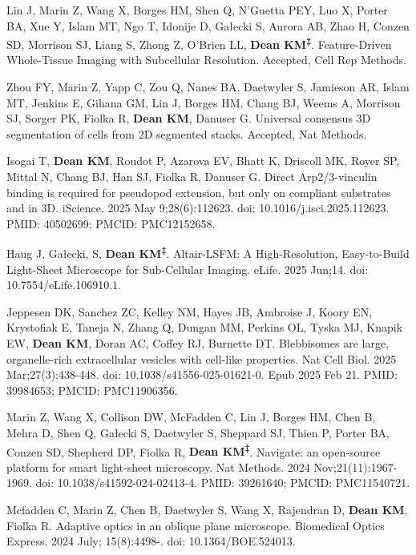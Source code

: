 \begin{etaremune}

\item Lin J, Marin Z, Wang X, Borges HM, Shen Q, N’Guetta PEY, Luo X, Porter BA, Xue Y, Islam MT, Ngo T, Idonije D, Gałecki S, Aurora AB, Zhao H, Conzen SD, Morrison SJ, Liang S, Zhong Z, O’Brien LL, \textbf{Dean KM\textsuperscript{‡}}. Feature-Driven Whole-Tissue Imaging with Subcellular Resolution. Accepted, Cell Rep Methods.

\item Zhou FY, Marin Z, Yapp C, Zou Q, Nanes BA, Daetwyler S, Jamieson AR, Islam MT, Jenkins E, Gihana GM, Lin J, Borges HM, Chang BJ, Weems A, Morrison SJ, Sorger PK, Fiolka R, \textbf{Dean KM}, Danuser G. Universal consensus 3D segmentation of cells from 2D segmented stacks. Accepted, Nat Methods.

\item Isogai T, \textbf{Dean KM}, Roudot P, Azarova EV, Bhatt K, Driscoll MK, Royer SP, Mittal N, Chang BJ, Han SJ, Fiolka R, Danuser G. Direct Arp2/3-vinculin binding is required for pseudopod extension, but only on compliant substrates and in 3D. iScience. 2025 May 9;28(6):112623. doi: 10.1016/j.isci.2025.112623. PMID: 40502699; PMCID: PMC12152658.

\item Haug J, Gałecki, S, \textbf{Dean KM\textsuperscript{‡}}. Altair-LSFM: A High-Resolution, Easy-to-Build Light-Sheet Microscope for Sub-Cellular Imaging. eLife. 2025 Jun;14. doi: 10.7554/eLife.106910.1.


\item Jeppesen DK, Sanchez ZC, Kelley NM, Hayes JB, Ambroise J, Koory EN, Krystofiak E, Taneja N, Zhang Q, Dungan MM, Perkins OL, Tyska MJ, Knapik EW, \textbf{Dean KM}, Doran AC, Coffey RJ, Burnette DT. Blebbisomes are large, organelle-rich extracellular vesicles with cell-like properties. Nat Cell Biol. 2025 Mar;27(3):438-448. doi: 10.1038/s41556-025-01621-0. Epub 2025 Feb 21. PMID: 39984653; PMCID: PMC11906356.

\item Marin Z, Wang X, Collison DW, McFadden C, Lin J, Borges HM, Chen B, Mehra D, Shen Q, Gałecki S, Daetwyler S, Sheppard SJ, Thien P, Porter BA, Conzen SD, Shepherd DP, Fiolka R, \textbf{Dean KM\textsuperscript{‡}}. Navigate: an open-source platform for smart light-sheet microscopy. Nat Methods. 2024 Nov;21(11):1967-1969. doi: 10.1038/s41592-024-02413-4. PMID: 39261640; PMCID: PMC11540721.

\item Mcfadden C, Marin Z, Chen B, Daetwyler S, Wang X, Rajendran D, \textbf{Dean KM}, Fiolka R. Adaptive optics in an oblique plane microscope. Biomedical Optics Express. 2024 July; 15(8):4498-. doi: 10.1364/BOE.524013.


\end{etaremune}

